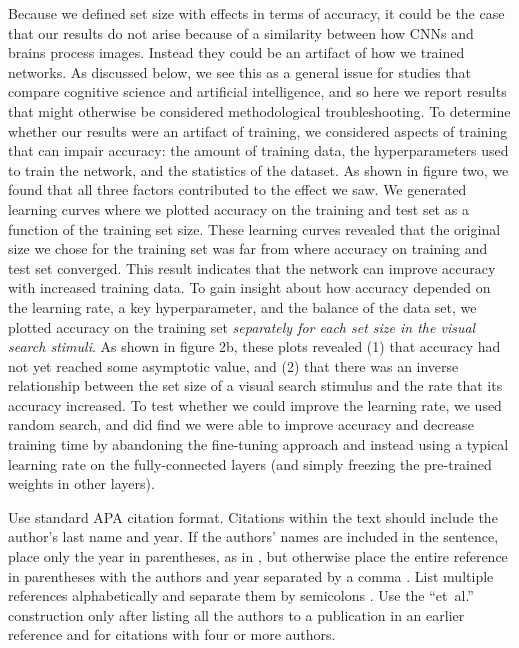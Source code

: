 \documentclass[10pt,letterpaper]{article}
\begin{document}
Because we defined set size with effects in terms of accuracy, it could 
be the case that our results do not arise because of a similarity between 
how CNNs and brains process images. Instead they could be an artifact of 
how we trained networks. As discussed below, we see this as a general issue 
for studies that compare cognitive science and artificial intelligence, and 
so here we report results that might otherwise be considered methodological 
troubleshooting.
To determine whether our results were an artifact of training, we considered aspects of 
training that can impair accuracy: the amount of training data, the hyperparameters 
used to train the network, and the statistics of the dataset. As shown in 
figure two, we found that all three factors contributed to the effect we saw.
We generated learning curves where we plotted accuracy on the training and 
test set as a function of the training set size. These learning curves revealed 
that the original size we chose for the training set was far from where 
accuracy on training and test set converged. This result indicates that the 
network can improve accuracy with increased training data. To gain insight 
about how accuracy depended on the learning rate, a key hyperparameter, and 
the balance of the data set, we plotted accuracy on the training set 
\emph{separately for each set size in the visual search stimuli}. As shown in 
figure 2b, these plots revealed (1) that accuracy had not yet reached some asymptotic 
value, and (2) that there was an inverse relationship between the set size of 
a visual search stimulus and the rate that its accuracy increased.
To test whether we could improve the learning rate, we used random search, and 
did find we were able to improve accuracy and decrease training time by 
abandoning the fine-tuning approach and instead using a typical learning rate 
on the fully-connected layers (and simply freezing the pre-trained weights in other layers). 

Use standard APA citation format. Citations within the text should
include the author's last name and year. If the authors' names are
included in the sentence, place only the year in parentheses, as in
, but otherwise place the entire reference in
parentheses with the authors and year separated by a comma
\cite{NewellSimon1972a}. List multiple references alphabetically and
separate them by semicolons
\cite{ChalnickBillman1988a,NewellSimon1972a}. Use the
``et~al.'' construction only after listing all the authors to a
publication in an earlier reference and for citations with four or
more authors.
\end{document}
